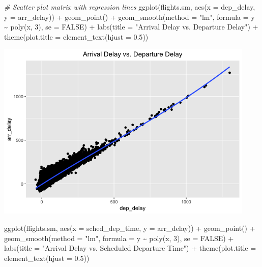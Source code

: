\documentclass[
]{article}
\newenvironment{Shaded}{\begin{snugshade}}{\end{snugshade}}
\newcommand{\AttributeTok}[1]{\textcolor[rgb]{0.77,0.63,0.00}{#1}}
\newcommand{\CommentTok}[1]{\textcolor[rgb]{0.56,0.35,0.01}{\textit{#1}}}
\newcommand{\ConstantTok}[1]{\textcolor[rgb]{0.00,0.00,0.00}{#1}}
\newcommand{\DecValTok}[1]{\textcolor[rgb]{0.00,0.00,0.81}{#1}}
\newcommand{\FloatTok}[1]{\textcolor[rgb]{0.00,0.00,0.81}{#1}}
\newcommand{\FunctionTok}[1]{\textcolor[rgb]{0.00,0.00,0.00}{#1}}
\newcommand{\NormalTok}[1]{#1}
\newcommand{\SpecialCharTok}[1]{\textcolor[rgb]{0.00,0.00,0.00}{#1}}
\newcommand{\StringTok}[1]{\textcolor[rgb]{0.31,0.60,0.02}{#1}}
\begin{document}
\begin{Shaded}
\begin{Highlighting}[]
\CommentTok{\# Scatter plot matrix with regression lines}
\FunctionTok{ggplot}\NormalTok{(flights.sm, }\FunctionTok{aes}\NormalTok{(}\AttributeTok{x =}\NormalTok{ dep\_delay, }\AttributeTok{y =}\NormalTok{ arr\_delay)) }\SpecialCharTok{+} \FunctionTok{geom\_point}\NormalTok{() }\SpecialCharTok{+}
    \FunctionTok{geom\_smooth}\NormalTok{(}\AttributeTok{method =} \StringTok{"lm"}\NormalTok{, }\AttributeTok{formula =}\NormalTok{ y }\SpecialCharTok{\textasciitilde{}} \FunctionTok{poly}\NormalTok{(x, }\DecValTok{3}\NormalTok{), }\AttributeTok{se =} \ConstantTok{FALSE}\NormalTok{) }\SpecialCharTok{+}
    \FunctionTok{labs}\NormalTok{(}\AttributeTok{title =} \StringTok{"Arrival Delay vs. Departure Delay"}\NormalTok{) }\SpecialCharTok{+} \FunctionTok{theme}\NormalTok{(}\AttributeTok{plot.title =} \FunctionTok{element\_text}\NormalTok{(}\AttributeTok{hjust =} \FloatTok{0.5}\NormalTok{))}
\end{Highlighting}
\end{Shaded}

\includegraphics{HW4-Trinath-Sai-Subhash-Reddy-Pittala_files/figure-latex/unnamed-chunk-2-1.png}

\begin{Shaded}
\begin{Highlighting}[]
\FunctionTok{ggplot}\NormalTok{(flights.sm, }\FunctionTok{aes}\NormalTok{(}\AttributeTok{x =}\NormalTok{ sched\_dep\_time, }\AttributeTok{y =}\NormalTok{ arr\_delay)) }\SpecialCharTok{+}
    \FunctionTok{geom\_point}\NormalTok{() }\SpecialCharTok{+} \FunctionTok{geom\_smooth}\NormalTok{(}\AttributeTok{method =} \StringTok{"lm"}\NormalTok{, }\AttributeTok{formula =}\NormalTok{ y }\SpecialCharTok{\textasciitilde{}} \FunctionTok{poly}\NormalTok{(x,}
    \DecValTok{3}\NormalTok{), }\AttributeTok{se =} \ConstantTok{FALSE}\NormalTok{) }\SpecialCharTok{+} \FunctionTok{labs}\NormalTok{(}\AttributeTok{title =} \StringTok{"Arrival Delay vs. Scheduled Departure Time"}\NormalTok{) }\SpecialCharTok{+}
    \FunctionTok{theme}\NormalTok{(}\AttributeTok{plot.title =} \FunctionTok{element\_text}\NormalTok{(}\AttributeTok{hjust =} \FloatTok{0.5}\NormalTok{))}
\end{Highlighting}
\end{Shaded}
\end{document}
